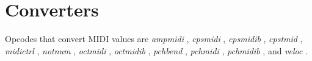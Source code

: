 \begin{comment}
\documentclass[10pt]{article}
\usepackage{fullpage, graphicx, url}
\setlength{\parskip}{1ex}
\setlength{\parindent}{0ex}
\title{Converters}



\begin{tabular}{ccc}
The Alternative Csound Reference Manual & & \\
Previous &MIDI Support &Next

\end{tabular}

\end{comment}
\section{Converters}


  Opcodes that convert MIDI values are \emph{ampmidi}
, \emph{cpsmidi}
, \emph{cpsmidib}
, \emph{cpstmid}
, \emph{midictrl}
, \emph{notnum}
, \emph{octmidi}
, \emph{octmidib}
, \emph{pchbend}
, \emph{pchmidi}
, \emph{pchmidib}
, and \emph{veloc}
. 


\begin{comment}
\begin{tabular}{lcr}
Previous &Home &Next \\
MIDI Support &Up &Event Extenders

\end{tabular}



\end{comment}
